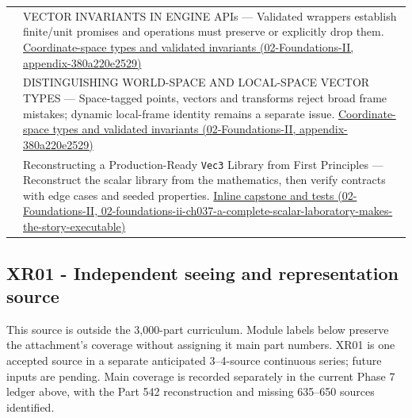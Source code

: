 {\begin{longtable}[]{@{}
  >{\raggedright\arraybackslash}p{}
  >{\raggedright\arraybackslash}p{}@{}}
598 & VECTOR INVARIANTS IN ENGINE APIs --- Validated wrappers establish finite/unit promises and operations must preserve or explicitly drop them. \href{../02-Foundations-II/main.pdf\#nameddest=appendix-380a220e2529}{Coordinate-space types and validated invariants (02-Foundations-II, appendix-380a220e2529)} \\
599 & DISTINGUISHING WORLD-SPACE AND LOCAL-SPACE VECTOR TYPES --- Space-tagged points, vectors and transforms reject broad frame mistakes; dynamic local-frame identity remains a separate issue. \href{../02-Foundations-II/main.pdf\#nameddest=appendix-380a220e2529}{Coordinate-space types and validated invariants (02-Foundations-II, appendix-380a220e2529)} \\
600 & Reconstructing a Production-Ready \texttt{Vec3} Library from First Principles --- Reconstruct the scalar library from the mathematics, then verify contracts with edge cases and seeded properties. \href{../02-Foundations-II/main.pdf\#nameddest=02-foundations-ii-ch037-a-complete-scalar-laboratory-makes-the-story-executable}{Inline capstone and tests (02-Foundations-II, 02-foundations-ii-ch037-a-complete-scalar-laboratory-makes-the-story-executable)} \\
\end{longtable}
}

\subsection{XR01 - Independent seeing and representation source}\label{appendix-fd090d982a15-xr01---independent-seeing-and-representation-source}

This source is outside the 3,000-part curriculum. Module labels below preserve the attachment's coverage without assigning it main part numbers. XR01 is one accepted source in a separate anticipated 3--4-source continuous series; future inputs are pending. Main coverage is recorded separately in the current Phase 7 ledger above, with the Part 542 reconstruction and missing 635--650 sources identified.


